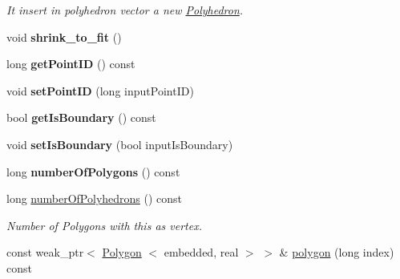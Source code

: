 \begin{DoxyCompactItemize}
\begin{DoxyCompactList}\small\item\em \-It insert in polyhedron vector a new \hyperlink{class_polyhedron}{\-Polyhedron}. \end{DoxyCompactList}\item 
\hypertarget{class_mesh_point_a3d9ebecff4fe87012077db61e25afba1}{void {\bfseries shrink\-\_\-to\-\_\-fit} ()}\label{class_mesh_point_a3d9ebecff4fe87012077db61e25afba1}

\item 
\hypertarget{class_mesh_point_ab373939208adf6f3a6720337b72ab4df}{long {\bfseries get\-Point\-I\-D} () const }\label{class_mesh_point_ab373939208adf6f3a6720337b72ab4df}

\item 
\hypertarget{class_mesh_point_a9fb3ec58099e4e711643cc0fae370f79}{void {\bfseries set\-Point\-I\-D} (long input\-Point\-I\-D)}\label{class_mesh_point_a9fb3ec58099e4e711643cc0fae370f79}

\item 
\hypertarget{class_mesh_point_a53fc7a6ea17475aafeec206c9de3edd8}{bool {\bfseries get\-Is\-Boundary} () const }\label{class_mesh_point_a53fc7a6ea17475aafeec206c9de3edd8}

\item 
\hypertarget{class_mesh_point_a2c0fb6d2c9eea8ff733c694eead116bc}{void {\bfseries set\-Is\-Boundary} (bool input\-Is\-Boundary)}\label{class_mesh_point_a2c0fb6d2c9eea8ff733c694eead116bc}

\item 
\hypertarget{class_mesh_point_a05dd421cf0eb43450b5b36e6460004b6}{long {\bfseries number\-Of\-Polygons} () const }\label{class_mesh_point_a05dd421cf0eb43450b5b36e6460004b6}

\item 
\hypertarget{class_mesh_point_a42eaf370ee97316363f183b2ed2fea30}{long \hyperlink{class_mesh_point_a42eaf370ee97316363f183b2ed2fea30}{number\-Of\-Polyhedrons} () const }\label{class_mesh_point_a42eaf370ee97316363f183b2ed2fea30}

\begin{DoxyCompactList}\small\item\em \-Number of \-Polygons with this as vertex. \end{DoxyCompactList}\item 
\hypertarget{class_mesh_point_afccab1b0b35b3823a69f2cc90cc6a043}{const weak\-\_\-ptr$<$ \hyperlink{class_polygon}{\-Polygon}\*
$<$ embedded, real $>$ $>$ \& \hyperlink{class_mesh_point_afccab1b0b35b3823a69f2cc90cc6a043}{polygon} (long index) const }\label{class_mesh_point_afccab1b0b35b3823a69f2cc90cc6a043}


\end{DoxyCompactItemize}
